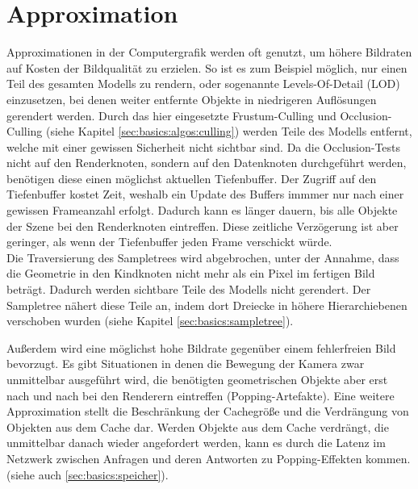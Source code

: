 \section{Approximation}
\label{sec:basics:approximation}
Approximationen in der Computergrafik werden oft genutzt, um höhere Bildraten auf Kosten der Bildqualität zu erzielen. So ist es zum Beispiel möglich, nur einen Teil des gesamten Modells zu rendern, oder sogenannte Levels-Of-Detail (LOD) einzusetzen, bei denen weiter entfernte Objekte in niedrigeren Auflösungen gerendert werden. Durch das hier eingesetzte Frustum-Culling und Occlusion-Culling (siehe Kapitel \ref{sec:basics:algos:culling}) werden Teile des Modells entfernt, welche mit einer gewissen Sicherheit nicht sichtbar sind. 
Da die Occlusion-Tests nicht auf den Renderknoten, sondern auf den Datenknoten durchgeführt werden, benötigen diese einen möglichst aktuellen Tiefenbuffer. Der Zugriff auf den Tiefenbuffer kostet Zeit, weshalb ein Update des Buffers immmer nur nach einer gewissen Frameanzahl erfolgt. Dadurch kann es länger dauern, bis alle Objekte der Szene bei den Renderknoten eintreffen. Diese zeitliche Verzögerung ist aber geringer, als wenn der Tiefenbuffer jeden Frame verschickt würde.\\
Die Traversierung des Sampletrees wird abgebrochen, unter der Annahme, dass die Geometrie in den Kindknoten nicht mehr als ein Pixel im fertigen Bild beträgt. Dadurch werden sichtbare Teile des Modells nicht gerendert. Der Sampletree nähert diese Teile an, indem dort Dreiecke in höhere Hierarchiebenen verschoben wurden (siehe Kapitel \ref{sec:basics:sampletree}).

Außerdem wird eine möglichst hohe Bildrate gegenüber einem fehlerfreien Bild bevorzugt. Es gibt Situationen in denen die Bewegung der Kamera zwar unmittelbar ausgeführt wird, die benötigten geometrischen Objekte aber erst nach und nach bei den Renderern eintreffen (Popping-Artefakte). Eine weitere Approximation stellt die Beschränkung der Cachegröße und die Verdrängung von Objekten aus dem Cache dar. Werden Objekte aus dem Cache verdrängt, die unmittelbar danach wieder angefordert werden, kann es durch die Latenz im Netzwerk zwischen Anfragen und deren Antworten zu Popping-Effekten kommen. (siehe auch \ref{sec:basics:speicher}). 
